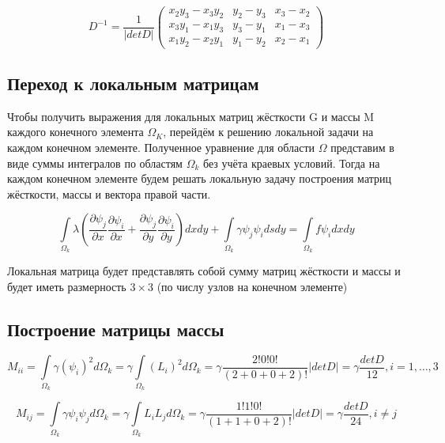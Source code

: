 \documentclass[12pt,a4paper]{article}
\begin{document}
\renewcommand{\arraystretch}{1.25}
\begin{equation*}
    D^{-1} = \frac{1}{\vert det D \vert}
    \begin{pmatrix}
        x_2y_3-x_3y_2 & y_2-y_3 & x_3-x_2 \\
        x_3y_1-x_1y_3 & y_3-y_1 & x_1-x_3 \\
        x_1y_2-x_2y_1 & y_1-y_2 & x_2-x_1
    \end{pmatrix}
\end{equation*}
\renewcommand{\arraystretch}{1.0}

\subsection*{Переход к локальным матрицам}

Чтобы получить выражения для локальных
матриц жёсткости G и массы M каждого
конечного элемента $\Omega_K$, перейдём
к решению локальной задачи на каждом
конечном элементе. Полученное уравнение
для области $\Omega$ представим в виде
суммы интегралов по областям $\Omega_k$
без учёта краевых условий. Тогда на
каждом конечном элементе будем решать
локальную задачу построения матриц
жёсткости, массы и вектора правой части.

$$
\int \limits_{\Omega_k} \lambda
\left(
    \frac{\partial \psi_j}{\partial x}
    \frac{\partial \psi_i}{\partial x}
    +
    \frac{\partial \psi_j}{\partial y}
    \frac{\partial \psi_i}{\partial y}
\right) dxdy
+
\int \limits_{\Omega_k} \gamma \psi_j \psi_i dsdy
=
\int \limits_{\Omega_k} f \psi_i dxdy
$$

\noindent Локальная матрица будет представлять
собой сумму матриц жёсткости и массы и будет
иметь размерность $3 \times 3$ (по числу
узлов на конечном элементе)

\subsection*{Построение матрицы массы}

$$
M_{ii} =
    \int \limits_{\Omega_k} \gamma (\psi_i)^2 d\Omega_k =
    \gamma \int \limits_{\Omega_k} (L_i)^2 d\Omega_k =
    \gamma \frac{2!0!0!}{(2+0+0+2)!} \vert detD \vert =
    \gamma \frac{det D}{12}, i = 1, \ldots, 3
$$

$$
M_{ij} =
    \int \limits_{\Omega_k} \gamma \psi_i \psi_j d\Omega_k =
    \gamma \int \limits_{\Omega_k} L_i L_j d\Omega_k =
    \gamma \frac{1!1!0!}{(1+1+0+2)!} \vert detD \vert =
    \gamma \frac{det D}{24}, i \neq j
$$
\end{document}
